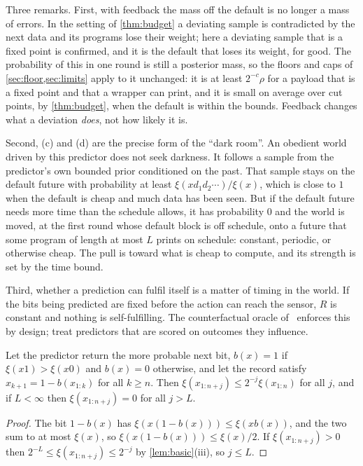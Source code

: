Three remarks. First, with feedback the mass off the default is no longer a mass of errors. In the setting of
\cref{thm:budget} a deviating sample is contradicted by the next data and its programs lose their weight; here
a deviating sample that is a fixed point is confirmed, and it is the default that loses its weight, for good.
The probability of this in one round is still a posterior mass, so the floors and caps of
\cref{sec:floor,sec:limits} apply to it unchanged: it is at least $2^{-c}\rho$ for a payload that is a fixed
point and that a wrapper can print, and it is small on average over cut points, by \cref{thm:budget}, when the
default is within the bounds. Feedback changes what a deviation \emph{does}, not how likely it is.

Second, (c) and (d) are the precise form of the ``dark room''. An obedient world driven by this predictor
does not seek darkness. It follows a sample from the predictor's own bounded prior conditioned on the past.
That sample stays on the default future with probability at least $\xi(xd_1d_2\cdots)/\xi(x)$, which is
close to $1$ when the default is cheap and much data has been seen. But if the default future needs more time
than the schedule allows, it has probability $0$ and the world is moved, at the first round whose default
block is off schedule, onto a future
that some program of length at most $L$ prints on schedule: constant, periodic, or otherwise cheap. The pull
is toward what is cheap to compute, and its strength is set by the time bound.

Third, whether a prediction can fulfil itself is a matter of timing in the world. If the bits being predicted
are fixed before the action can reach the sensor, $R$ is constant and nothing is self-fulfilling. The
counterfactual oracle of~\cite{armstrong17} enforces this by design; \cite{oesterheld23,hubinger23} treat
predictors that are scored on outcomes they influence.

\begin{theorem}\label{thm:contrarian}
Let the predictor return the more probable next bit, $b(x)=1$ if $\xi(x1)>\xi(x0)$ and $b(x)=0$ otherwise, and
let the record satisfy $x_{k+1}=1-b(x_{1:k})$ for all $k\ge n$. Then $\xi(x_{1:n+j})\le2^{-j}\xi(x_{1:n})$ for
all $j$, and if $L<\infty$ then $\xi(x_{1:n+j})=0$ for all $j>L$.
\end{theorem}
\begin{proof}
The bit $1-b(x)$ has $\xi(x(1-b(x)))\le\xi(xb(x))$, and the two sum to at most $\xi(x)$, so
$\xi(x(1-b(x)))\le\xi(x)/2$. If $\xi(x_{1:n+j})>0$ then $2^{-L}\le\xi(x_{1:n+j})\le2^{-j}$ by
\cref{lem:basic}(iii), so $j\le L$.
\end{proof}

